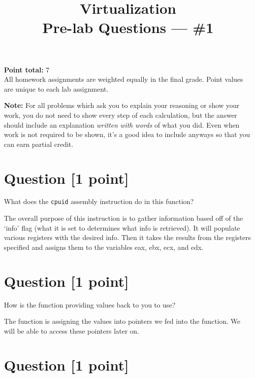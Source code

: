 \documentclass[11pt]{article}
\providecommand{\due}{}
\begin{document}
\title{Virtualization\\Pre-lab Questions --- \#1}
\date{\due}

\maketitle

\noindent \textbf{Point total:} 7
\\ All homework assignments are weighted equally in the final grade. Point values are unique to each lab assignment.

\textbf{Note:} For all problems which ask you to explain your reasoning or show your work, you do not need to show every step of each calculation, but the answer should include an explanation \emph{written with words} of what you did.  Even when work is not required to be shown, it’s a good idea to include anyways so that you can earn partial credit.

\section{Question [1 point]}

What does the \texttt{cpuid} assembly instruction do in this function?

\begin{solution}
The overall purpose of this instruction is to gather information based off of the `info' flag 
(what it is set to determines what info is retrieved). It will populate various registers with the 
desired info. Then it takes the results from the 
registers specified and assigns them to the variables eax, ebx, ecx, and edx. 
\end{solution}


\section{Question [1 point]}

How is the function providing values back to you to use?

\begin{solution}
The function is assigning the values into pointers we fed into the function. We will be able to 
access these pointers later on. 
\end{solution}


\section{Question [1 point]}
\end{document}
